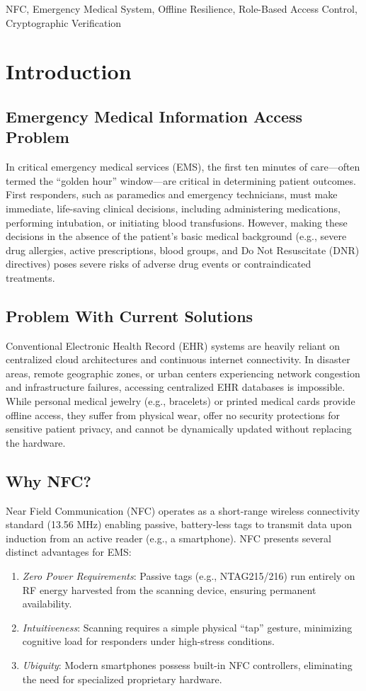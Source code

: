 \documentclass[conference]{IEEEtran}
\begin{document}
\begin{IEEEkeywords}
NFC, Emergency Medical System, Offline Resilience, Role-Based Access Control, Cryptographic Verification
\end{IEEEkeywords}

\section{Introduction}
\subsection{Emergency Medical Information Access Problem}
In critical emergency medical services (EMS), the first ten minutes of care---often termed the ``golden hour'' window---are critical in determining patient outcomes. First responders, such as paramedics and emergency technicians, must make immediate, life-saving clinical decisions, including administering medications, performing intubation, or initiating blood transfusions. However, making these decisions in the absence of the patient's basic medical background (e.g., severe drug allergies, active prescriptions, blood groups, and Do Not Resuscitate (DNR) directives) poses severe risks of adverse drug events or contraindicated treatments.

\subsection{Problem With Current Solutions}
Conventional Electronic Health Record (EHR) systems are heavily reliant on centralized cloud architectures and continuous internet connectivity. In disaster areas, remote geographic zones, or urban centers experiencing network congestion and infrastructure failures, accessing centralized EHR databases is impossible. While personal medical jewelry (e.g., bracelets) or printed medical cards provide offline access, they suffer from physical wear, offer no security protections for sensitive patient privacy, and cannot be dynamically updated without replacing the hardware.

\subsection{Why NFC?}
Near Field Communication (NFC) operates as a short-range wireless connectivity standard (13.56 MHz) enabling passive, battery-less tags to transmit data upon induction from an active reader (e.g., a smartphone). NFC presents several distinct advantages for EMS:
\begin{enumerate}
\item \textit{Zero Power Requirements}: Passive tags (e.g., NTAG215/216) run entirely on RF energy harvested from the scanning device, ensuring permanent availability.
\item \textit{Intuitiveness}: Scanning requires a simple physical ``tap'' gesture, minimizing cognitive load for responders under high-stress conditions.
\item \textit{Ubiquity}: Modern smartphones possess built-in NFC controllers, eliminating the need for specialized proprietary hardware.
\end{enumerate}
\end{document}
